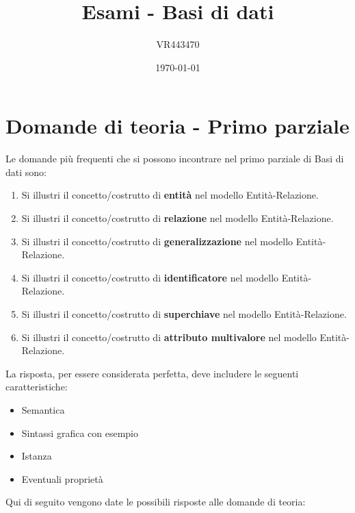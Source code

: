 \documentclass[a4paper]{article}
\begin{document}
	\author{VR443470}
	\title{Esami - Basi di dati}
	\date{\printdayoff\today}
	\maketitle

	\newpage
	
	\tableofcontents
	
	\newpage
		
	\section{Domande di teoria - Primo parziale}
	
	Le domande più frequenti che si possono incontrare nel primo parziale di Basi di dati sono:
	\begin{enumerate}
		\item Si illustri il concetto/costrutto di \textbf{entità} nel modello Entità-Relazione.
		
		\item Si illustri il concetto/costrutto di \textbf{relazione} nel modello Entità-Relazione.
		
		\item Si illustri il concetto/costrutto di \textbf{generalizzazione} nel modello Entità-Relazione.
		
		\item Si illustri il concetto/costrutto di \textbf{identificatore} nel modello Entità-Relazione.
		
		\item Si illustri il concetto/costrutto di \textbf{superchiave} nel modello Entità-Relazione.
		
		\item Si illustri il concetto/costrutto di \textbf{attributo multivalore} nel modello Entità-Relazione.
	\end{enumerate}
	La risposta, per essere considerata perfetta, deve includere le seguenti caratteristiche:
	\begin{itemize}
		\item Semantica
		\item Sintassi grafica con esempio
		\item Istanza
		\item Eventuali proprietà
	\end{itemize}
	Qui di seguito vengono date le possibili risposte alle domande di teoria:
\end{document}
